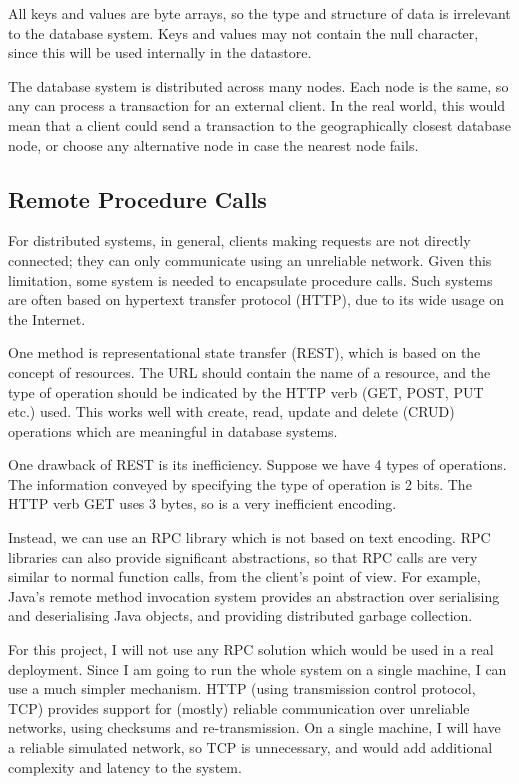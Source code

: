 \documentclass[12pt,a4paper]{article}
\begin{document}
All keys and values are byte arrays, so the type and structure of data is irrelevant to the database system. Keys and values may not contain the null character, since this will be used internally in the datastore.

The database system is distributed across many nodes. Each node is the same, so any can process a transaction for an external client. In the real world, this would mean that a client could send a transaction to the geographically closest database node, or choose any alternative node in case the nearest node fails.

\subsection*{Remote Procedure Calls}

For distributed systems, in general, clients making requests are not directly connected; they can only communicate using an unreliable network. Given this limitation, some system is needed to encapsulate procedure calls. Such systems are often based on hypertext transfer protocol (HTTP), due to its wide usage on the Internet.

One method is representational state transfer (REST), which is based on the concept of resources. The URL should contain the name of a resource, and the type of operation should be indicated by the HTTP verb (GET, POST, PUT etc.) used. This works well with create, read, update and delete (CRUD) operations which are meaningful in database systems.

One drawback of REST is its inefficiency. Suppose we have 4 types of operations. The information conveyed by specifying the type of operation is 2 bits. The HTTP verb GET uses 3 bytes, so is a very inefficient encoding.

Instead, we can use an RPC library which is not based on text encoding. RPC libraries can also provide significant abstractions, so that RPC calls are very similar to normal function calls, from the client's point of view. For example, Java's remote method invocation system provides an abstraction over serialising and deserialising Java objects, and providing distributed garbage collection.

For this project, I will not use any RPC solution which would be used in a real deployment. Since I am going to run the whole system on a single machine, I can use a much simpler mechanism. HTTP (using transmission control protocol, TCP) provides support for (mostly) reliable communication over unreliable networks, using checksums and re-transmission. On a single machine, I will have a reliable simulated network, so TCP is unnecessary, and would add additional complexity and latency to the system.
\end{document}
